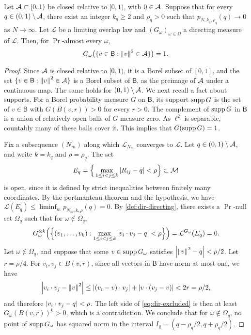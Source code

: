 \begin{lemma}\label{lem:dir-exclusion}
Let $\mathcal A\subset[0,1)$ be closed relative to $[0,1)$, with $0\in\mathcal A$. Suppose that for every $q\in(0,1)\setminus\mathcal A$, there exist an integer $k_q\ge2$ and $\rho_q>0$ such that $p_{N,k_q,\rho_q}(q)\to0$ as $N\to\infty$. Let $\mathcal L$ be a limiting overlap law and $(G_\omega)_{\omega\in\Omega}$ a directing measure of $\mathcal L$. Then, for $\Pr$-almost every $\omega$,
\[
G_\omega\big(\{v\in\mathsf B:\left\lVert v\right\rVert^2\in\mathcal A\}\big)=1.
\]
\end{lemma}

\begin{proof}
Since $\mathcal A$ is closed relative to $[0,1)$, it is a Borel subset of $[0,1]$, and the set $\{v\in\mathsf B:\left\lVert v\right\rVert^2\in\mathcal A\}$ is a Borel subset of $\mathsf B$, as the preimage of $\mathcal A$ under a continuous map. The same holds for $(0,1)\setminus\mathcal A$. We next recall a fact about supports. For a Borel probability measure $G$ on $\mathsf B$, its support $\operatorname{supp} G$ is the set of $v\in\mathsf B$ with $G(B(v,r))>0$ for every $r>0$. The complement of $\operatorname{supp} G$ in $\mathsf B$ is a union of relatively open balls of $G$-measure zero. As $\ell^2$ is separable, countably many of these balls cover it. This implies that $G(\operatorname{supp} G)=1$.

Fix a subsequence $(N_m)$ along which $\mathcal L_{N_m}$ converges to $\mathcal L$. Let $q\in(0,1)\setminus\mathcal A$, and write $k=k_q$ and $\rho=\rho_q$. The set
\[
E_q=\Big\{\max_{1\le i<j\le k}\left|R_{ij}-q\right|<\rho\Big\}\subset\mathcal M
\]
is open, since it is defined by strict inequalities between finitely many coordinates. By the portmanteau theorem and the hypothesis, we have $\mathcal L(E_q)\le\liminf_mp_{N_m,k,\rho}(q)=0$. By \cref{def:dir-directing}, there exists a $\Pr$-null set $\Omega_q$ such that for $\omega\notin\Omega_q$,
\begin{equation}\label{eq:dir-excluded}
G_\omega^{\otimes k}\Big(\Big\{(v_1,\dots,v_k):\max_{1\le i<j\le k}\left|v_i\cdot v_j-q\right|<\rho\Big\}\Big)=\mathcal L^{G_\omega}(E_q)=0.
\end{equation}
Let $\omega\notin\Omega_q$, and suppose that some $v\in\operatorname{supp} G_\omega$ satisfies $\left|\left\lVert v\right\rVert^2-q\right|<\rho/2$. Let $r=\rho/4$. For $v_i,v_j\in B(v,r)$, since all vectors in $\mathsf B$ have norm at most one, we have
\[
\left|v_i\cdot v_j-\left\lVert v\right\rVert^2\right|\le\left|(v_i-v)\cdot v_j\right|+\left|v\cdot(v_j-v)\right|<2r=\rho/2,
\]
and therefore $\left|v_i\cdot v_j-q\right|<\rho$. The left side of \eqref{eq:dir-excluded} is then at least $G_\omega(B(v,r))^k>0$, which is a contradiction. We conclude that for $\omega\notin\Omega_q$, no point of $\operatorname{supp} G_\omega$ has squared norm in the interval $I_q=(q-\rho_q/2,q+\rho_q/2)$.


\end{proof}
